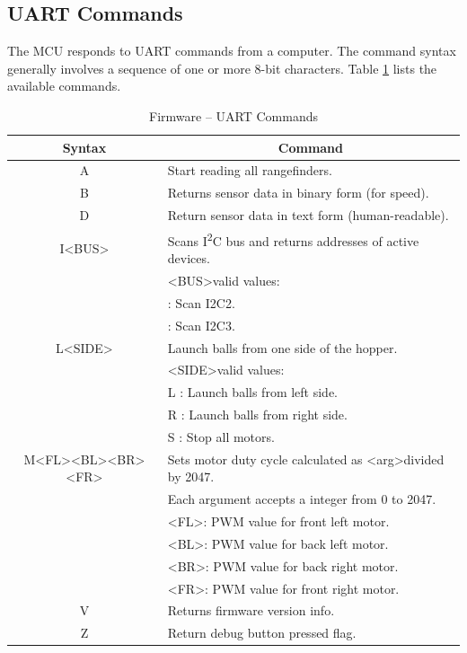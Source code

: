 \subsection{UART Commands}
The MCU responds to UART commands from a computer. The command syntax generally involves a sequence of one or more 8-bit characters. Table \ref{tab:firmware_uart_specs} lists the available commands. 
\begin{table}[H]
	\centering	\caption{Firmware -- UART Commands} 
	\begin{tabular}{cp{4in}}
		\hline 
		Syntax & \multicolumn{1}{c}{Command} \\ \hline 
		A & Start reading all rangefinders. \\ \hline 
		B & Returns sensor data in binary form (for speed). \\ \hline 
		D & Return sensor data in text form (human-readable). \\ \hline 
		I\textless BUS\textgreater & Scans I\textsuperscript{2}C bus and returns addresses of active devices. \\ 
		& \textless BUS\textgreater valid values: \\ 
		& \qquad 2 : Scan I2C2. \\
		& \qquad 3 : Scan I2C3. \\ \hline 			
		L\textless SIDE\textgreater & Launch balls from one side of the hopper. \\
		& \textless SIDE\textgreater valid values: \\ 
		& \qquad L : Launch balls from left side. \\
		& \qquad R : Launch balls from right side. \\
		& \qquad S : Stop all motors. \\ \hline 
		M\textless FL\textgreater\textless BL\textgreater\textless BR\textgreater\textless FR\textgreater & Sets motor duty cycle calculated as \textless arg\textgreater divided by 2047. \\ 
		& Each argument accepts a integer from 0 to 2047. \\
		& \textless FL\textgreater : PWM value for front left motor. \\
		& \textless BL\textgreater : PWM value for back left motor. \\
		& \textless BR\textgreater : PWM value for back right motor. \\
		& \textless FR\textgreater : PWM value for front right motor. \\ \hline 		
		V & Returns firmware version info. \\ \hline 
		Z & Return debug button pressed flag. \\ \hline 
	\end{tabular} 
	\label{tab:firmware_uart_specs}
\end{table}

